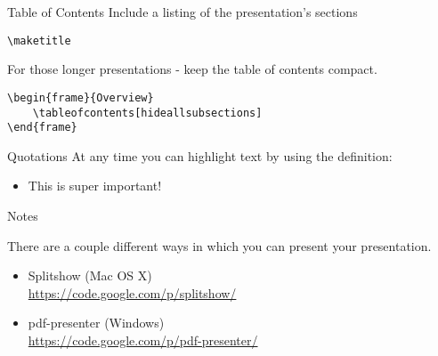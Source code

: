 \documentclass[compress,PxFont]{beamer}
\begin{document}

\begin{frame}[containsverbatim]{Table of Contents}
Include a listing of the presentation's sections 
\begin{verbatim}
\maketitle
\end{verbatim}
For those longer presentations - keep the table of contents compact.
\begin{verbatim}
\begin{frame}{Overview}
    \tableofcontents[hideallsubsections]
\end{frame}
\end{verbatim}
\end{frame}


\begin{frame}[containsverbatim]{Quotations}
At any time you can highlight text by using the definition:
\begin{itemize}
	\item \alert{This is super important!}
\end{itemize}

\end{frame}


\begin{frame}{Notes}
    
    There are a couple different ways in which you can present your presentation.

	\begin{itemize}
		\item Splitshow (Mac OS X)\\\url{https://code.google.com/p/splitshow/}
		\item pdf-presenter (Windows)\\\url{https://code.google.com/p/pdf-presenter/}
	\end{itemize}
\end{frame}

\end{document}
